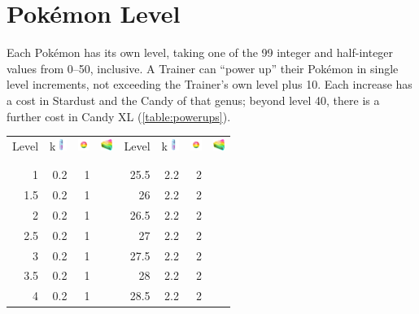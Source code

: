 \section{Pokémon Level}
\label{sec:plevel}
Each Pokémon has its own level, taking one of the 99 integer and half-integer
 values from 0--50, inclusive.
A Trainer can ``power up'' their Pokémon in single level increments,
 not exceeding the Trainer's own level plus 10.
Each increase has a cost in Stardust and the Candy of that genus; beyond level 40, there
  is a further cost in Candy XL (\autoref{table:powerups}).
\begin{table}
  \footnotesize
  \begin{center}
    \begin{tabular}[ht]{rrrr|rrrr}
      Level &
        k\includegraphics[width=1em,height=1em]{images/stardust.png} &
        \includegraphics[width=1em,height=1em]{images/rarecandy.png} &
        \includegraphics[width=1em,height=1em]{images/rarecandyxl.png} &
      Level &
        k\includegraphics[width=1em,height=1em]{images/stardust.png} &
        \includegraphics[width=1em,height=1em]{images/rarecandy.png} &
        \includegraphics[width=1em,height=1em]{images/rarecandyxl.png} \\
      \Midrule\\\\
        1 & 0.2 & 1 & & 25.5 & 2.2 & 2 & \\
      1.5 & 0.2 & 1 & & 26 & 2.2 & 2 & \\
        2 & 0.2 & 1 & & 26.5 & 2.2 & 2 & \\
      2.5 & 0.2 & 1 & & 27 & 2.2 & 2 & \\
        3 & 0.2 & 1 & & 27.5 & 2.2 & 2 & \\
      3.5 & 0.2 & 1 & & 28 & 2.2 & 2 & \\
        4 & 0.2 & 1 & & 28.5 & 2.2 & 2 & \\

\end{tabular}
\end{center}
\end{table}
